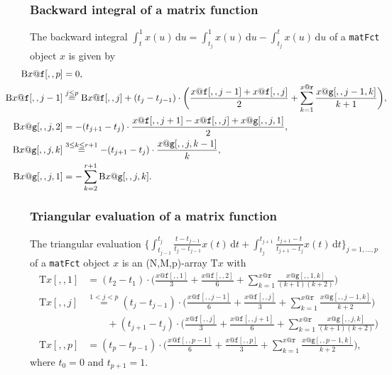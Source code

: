 \documentclass[12pt,a4paper]{article}
\newcommand{\df}{\text{d}}
\begin{document}
\subsubsection{Backward integral of a matrix function}

The backward integral $\int_t^1 x(u)\, \df u = \int_{t_j}^1 x(u)\, \df u - \int_{t_j}^t x(u)\, \df u$ of a \texttt{matFct} object $x$ is given by
\begin{equation*}
\hspace{-1cm}
\begin{aligned}
\mathrm{B}x@\texttt{f}[,,p] &= 0, \\
\mathrm{B}x@\texttt{f}[,,j-1] &\overset{j \le p}{=} \mathrm{B}x@\texttt{f}[,,j] + (t_j - t_{j-1}) \cdot \bigg( \frac{x@\texttt{f}[,,j-1] + x@\texttt{f}[,,j]}{2} + \sum_{k=1}^{x@\texttt{r}} \frac{x@\texttt{g}[,,j-1,k]}{k+1} \bigg), \\
\mathrm{B}x@\texttt{g}[,,j,2] &= -(t_{j+1}-t_j) \cdot \frac{x@\texttt{f}[,,j+1] - x@\texttt{f}[,,j] + x@\texttt{g}[,,j,1]}{2}, \\
\mathrm{B}x@\texttt{g}[,,j,k] &\overset{3 \le k \le r+1}{=} -(t_{j+1}-t_j) \cdot \frac{x@\texttt{g}[,,j,k-1]}{k}, \\
\mathrm{B}x@\texttt{g}[,,j,1] &= -\sum_{k=2}^{r+1} \mathrm{B}x@\texttt{g}[,,j,k].
\end{aligned}
\end{equation*}


\subsubsection{Triangular evaluation of a matrix function}

The triangular evaluation $\big\{ \int_{t_{j-1}}^{t_j} \frac{t-t_{j-1}}{t_j-t_{j-1}} x(t)\, \df t + \int_{t_j}^{t_{j+1}} \frac{t_{j+1}-t}{t_{j+1}-t_j} x(t)\, \df t \big\}_{j=1,\dotsc,p}$ of a \texttt{matFct} object $x$ is an (N,M,p)-array $\mathrm{T}x$ with
\begin{align*}
\mathrm{T}x[,,1] &= (t_2-t_1) \cdot \bigg( \frac{x@\texttt{f}[,,1]}{3} + \frac{x@\texttt{f}[,,2]}{6} + \sum_{k=1}^{x@\texttt{r}} \frac{x@\texttt{g}[,,1,k]}{(k+1)(k+2)} \bigg) \\
\mathrm{T}x[,,j] &\overset{1 < j < p}{=} (t_j-t_{j-1}) \cdot \bigg( \frac{x@\texttt{f}[,,j-1]}{6} + \frac{x@\texttt{f}[,,j]}{3} + \sum_{k=1}^{x@\texttt{r}} \frac{x@\texttt{g}[,,j-1,k]}{k+2} \bigg) \\
&\qquad + (t_{j+1}-t_j) \cdot \bigg( \frac{x@\texttt{f}[,,j]}{3} + \frac{x@\texttt{f}[,,j+1]}{6} + \sum_{k=1}^{x@\texttt{r}} \frac{x@\texttt{g}[,,j,k]}{(k+1)(k+2)} \bigg) \\
\mathrm{T}x[,,p] &= (t_p-t_{p-1}) \cdot \bigg( \frac{x@\texttt{f}[,,p-1]}{6} + \frac{x@\texttt{f}[,,p]}{3} + \sum_{k=1}^{x@\texttt{r}} \frac{x@\texttt{g}[,,p-1,k]}{k+2} \bigg),
\end{align*}
where $t_0=0$ and $t_{p+1}=1$.
\end{document}
